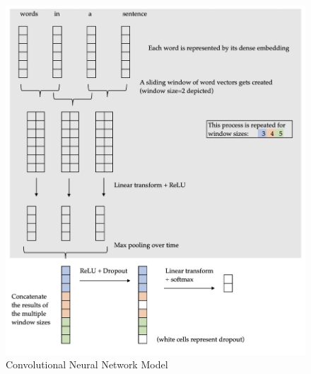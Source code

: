 \documentclass[11pt]{article}
\begin{document}
\begin{figure}[htb]
\centering
\includegraphics[width=\textwidth]{figs/convnet.png}
\caption{Convolutional Neural Network Model}
\label{fig:convnet}
\end{figure}
\end{document}
